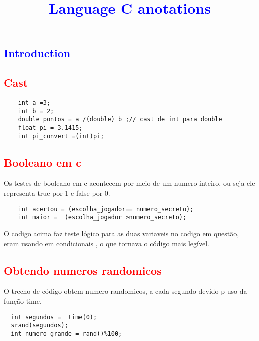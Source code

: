 \documentclass{article}
\date{}
\title{\textbf{\textcolor{blue}{Language C anotations}}}
\begin{document}
\maketitle
\begin{multicols}{2}
\textcolor{blue}{\section{\textcolor{blue}{Introduction}}}
\textcolor{red}{\subsection{\textbf{\textcolor{red}{Cast}}}}
\begin{lstlisting}
    int a =3;
    int b = 2;
    double pontos = a /(double) b ;// cast de int para double
    float pi = 3.1415;
    int pi_convert =(int)pi;  
\end{lstlisting}
\textcolor{red}{\subsection{Booleano em c}}
Os testes de booleano em c acontecem por meio de um numero inteiro, ou seja ele representa true por 1 e false por 0. 
\begin{lstlisting}
    int acertou = (escolha_jogador== numero_secreto);
    int maior =  (escolha_jogador >numero_secreto);
\end{lstlisting}
O codigo acima faz teste lógico para as duas variaveis no codigo em questão, eram usando em condicionais , o que tornava o código mais legível.
\textcolor{red}{\subsection{Obtendo numeros randomicos}}
O trecho de código obtem numero randomicos, a cada segundo devido p uso da função time. 

\begin{lstlisting}
  int segundos =  time(0);
  srand(segundos);
  int numero_grande = rand()%100;
\end{lstlisting}




\end{multicols}
\end{document}

